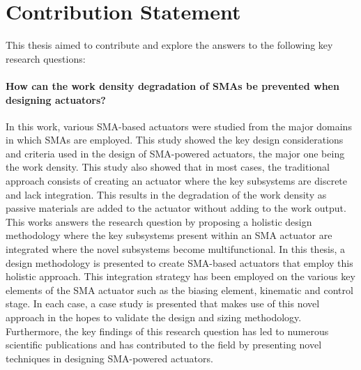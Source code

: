 \section*{Contribution Statement}

This thesis aimed to contribute and explore the answers to the following key research questions:

\paragraph{How can the work density degradation of SMAs be prevented when designing actuators?}
In this work, various SMA-based actuators were studied from the major domains in which SMAs are employed. This study showed the key design considerations and criteria used in the design of SMA-powered actuators, the major one being the work density. This study also showed that in most cases, the traditional approach consists of creating an actuator where the key subsystems are discrete and lack integration. This results in the degradation of the work density as passive materials are added to the actuator without adding to the work output. This works answers the research question by proposing a holistic design methodology where the key subsystems present within an SMA actuator are integrated where the novel subsystems become multifunctional. In this thesis, a design methodology is presented to create SMA-based actuators that employ this holistic approach. This integration strategy has been employed on the various key elements of the SMA actuator such as the biasing element, kinematic and control stage. In each case, a case study is presented that makes use of this novel approach in the hopes to validate the design and sizing methodology. Furthermore, the key findings of this research question has led to numerous scientific publications and has contributed to the field by presenting novel techniques in designing SMA-powered actuators.

